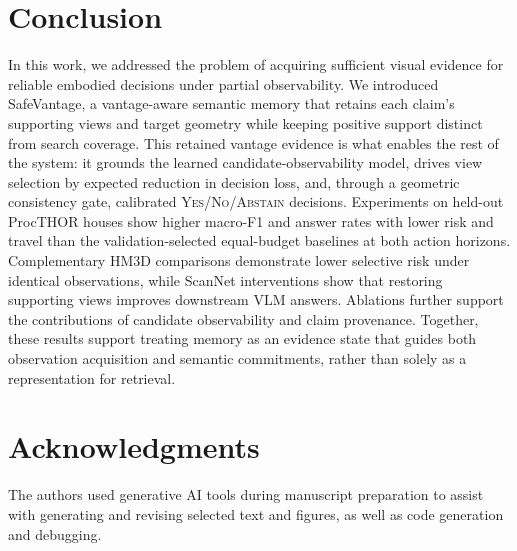 \documentclass[letterpaper, 10 pt, conference]{ieeeconf}
\newcommand{\method}{SafeVantage}
\begin{document}
\section{Conclusion}

In this work, we addressed the problem of acquiring sufficient visual evidence for reliable embodied decisions under partial observability. We introduced \method{}, a vantage-aware semantic memory that retains each claim's supporting views and target geometry while keeping positive support distinct from search coverage. This retained vantage evidence is what enables the rest of the system: it grounds the learned candidate-observability model, drives view selection by expected reduction in decision loss, and, through a geometric consistency gate, calibrated \textsc{Yes}/\textsc{No}/\textsc{Abstain} decisions. Experiments on held-out ProcTHOR houses show higher macro-F1 and answer rates with lower risk and travel than the validation-selected equal-budget baselines at both action horizons. Complementary HM3D comparisons demonstrate lower selective risk under identical observations, while ScanNet interventions show that restoring supporting views improves downstream VLM answers. Ablations further support the contributions of candidate observability and claim provenance. Together, these results support treating memory as an evidence state that guides both observation acquisition and semantic commitments, rather than solely as a representation for retrieval.

\section{Acknowledgments}
The authors used generative AI tools during manuscript preparation to assist with generating and revising selected text and figures, as well as code generation and debugging.
    
    
\end{document}
